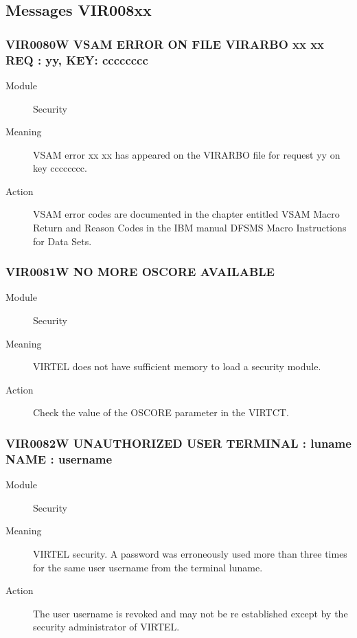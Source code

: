 \documentclass[letterpaper,10pt,english]{sphinxmanual}
\begin{document}
\subsection{Messages VIR008xx}
\label{\detokenize{messages:messages-vir008xx}}

\subsubsection{VIR0080W VSAM ERROR ON FILE VIRARBO xx xx REQ : yy, KEY: cccccccc}
\label{\detokenize{messages:vir0080w-vsam-error-on-file-virarbo-xx-xx-req-yy-key-cccccccc}}\begin{description}
\item[{Module}] \leavevmode
Security

\item[{Meaning}] \leavevmode
VSAM error xx xx has appeared on the VIRARBO file for request yy on key cccccccc.

\item[{Action}] \leavevmode
VSAM error codes are documented in the chapter entitled VSAM Macro Return and Reason Codes in the IBM manual DFSMS Macro Instructions for Data Sets.

\end{description}


\subsubsection{VIR0081W NO MORE OSCORE AVAILABLE}
\label{\detokenize{messages:vir0081w-no-more-oscore-available}}\begin{description}
\item[{Module}] \leavevmode
Security

\item[{Meaning}] \leavevmode
VIRTEL does not have sufficient memory to load a security module.

\item[{Action}] \leavevmode
Check the value of the OSCORE parameter in the VIRTCT.

\end{description}


\subsubsection{VIR0082W UNAUTHORIZED USER TERMINAL : luname NAME : username}
\label{\detokenize{messages:vir0082w-unauthorized-user-terminal-luname-name-username}}\begin{description}
\item[{Module}] \leavevmode
Security

\item[{Meaning}] \leavevmode
VIRTEL security. A password was erroneously used more than three times for the same user username from the terminal luname.

\item[{Action}] \leavevmode
The user username is revoked and may not be re established except by the security administrator of VIRTEL.

\end{description}
\end{document}
